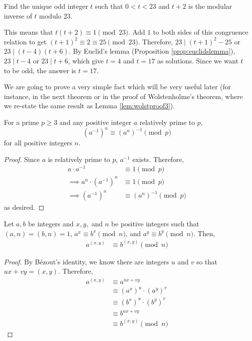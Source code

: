 \documentclass{subfile}
\begin{document}
	\begin{problem}
		Find the unique odd integer $t$ such that $0<t<23$ and $t+2$ is the modular inverse of $t$ modulo $23$.
	\end{problem}

	\begin{solution}
		This means that $t(t+2)\equiv 1 \pmod{23}$. Add $1$ to both sides of this congruence relation to get $(t+1)^2 \equiv 2 \equiv 25\pmod{23}$. Therefore, $23\mid (t+1)^2-25$ or $23\mid (t-4)(t+6)$. By Euclid's lemma (Proposition \ref{prop:euclidslemma}), $23\mid t-4$ or $23\mid t+6$, which give $t=4$ and $t=17$ as solutions. Since we want $t$ to be odd, the answer is $t=17$.
	\end{solution}

We are going to prove a very simple fact which will be very useful later (for instance, in the next theorem or in the proof of Wolstenholme's theorem, where we re-state the same result as Lemma \ref{lem:wolstproof3}).

	\begin{proposition}\label{prop:inversepower}
		For a prime $p\geq 3$ and any positive integer $a$ relatively prime to $p$,
		\[ (a^{-1})^n \equiv (a^n)^{-1} \pmod p\]
		for all positive integers $n$.
	\end{proposition}

	\begin{proof}
		Since $a$ is relatively prime to $p$, $a^{-1}$ exists. Therefore,
			\begin{align*}
				a \cdot a^{-1}
					& \equiv 1 \pmod p\\
				\implies a^n \cdot (a^{-1})^n
					& \equiv 1 \pmod p\\
				\implies (a^{-1})^n
					& \equiv (a^n)^{-1} \pmod p
			\end{align*}
		as desired.
	\end{proof}



	\begin{theorem}\label{thm:modgcd}
	Let $a,b$ be integers and $x,y,$ and $n$ be positive integers such that $(a,n)=(b,n)=1$,  $a^x\equiv b^x\pmod n$, and $a^y\equiv b^y\pmod n$. Then,
	\begin{align*}
		a^{(x,y)} & \equiv b^{(x,y)}\pmod n
	\end{align*}
\end{theorem}

\begin{proof}
	By B\'{e}zout's identity, we know there are integers $u$ and $v$ so that $ux+vy=(x,y)$. Therefore,
	\begin{align}
		a^{(x,y)} &\equiv a^{ux+vy}\nonumber\\
		&\equiv \left(a^x\right)^u \cdot \left(a^y\right)^v\\
		& \equiv \left(b^x\right)^u \cdot \left(b^y\right)^v\label{eq:modgcd}\\
		&\equiv b^{ux+vy}\\
		& \equiv b^{(x,y)} \pmod n\nonumber
	\end{align}
\end{proof}
\end{document}

